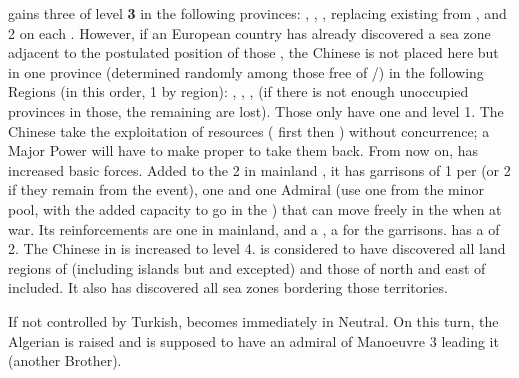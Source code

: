 \phevnt
\aparag \paysChine gains three \TP of level {\bf 3} in the following
provinces: \provinceCalicut, , \provinceMadras, replacing
existing \TP from \paysGujerat, and 2 \DT on each \TP.
\aparag However, if an European country has already discovered a sea zone
adjacent to the postulated position of those \TP, the Chinese \TP is not
placed here but in one province (determined randomly among those free of
\TP/\COL) in the following Regions (in this order, 1 by region):
\granderegionJava, \granderegionCelebes, \granderegionSumatra,
 (if there is not enough unoccupied provinces in
those, the remaining \TP are lost).  Those \TP only have one \DT and level 1.
\aparag The Chinese \TP take the exploitation of resources ( first then ) without concurrence; a Major Power will
have to make proper \CONC to take them back.
\aparag From now on, \paysChine has increased basic forces.  Added to the 2
\ARMY\faceplus in mainland \paysChine, it has garrisons of 1 \LD per \TP (or 2
\LD if they remain from the event), one \FLEET\faceplus and one Admiral (use
one from the minor pool, with the added capacity to go in the \ROTW) that can
move freely in the \ROTW when at war. Its reinforcements are one
\ARMY\faceplus in mainland, and a \LD, a \ND for the garrisons.
\aparag \paysChine has a \FTI of 2. The Chinese \TradeFLEET in 
is increased to level 4.
\aparag \paysChine is considered to have discovered all land regions of
\continentAsia (including islands but \granderegionOceania and
\granderegionPacifique excepted) and those of \continentAfrica north and east
of \granderegionNatal included. It also has discovered all sea zones bordering
those territories.






\phevnt
\aparag If not controlled by Turkish, \paysAlgerie becomes immediately in
Neutral.
\aparag On this turn, the Algerian \corsaire is raised \faceplus and is
supposed to have an admiral of Manoeuvre 3 leading it (another Brother).





